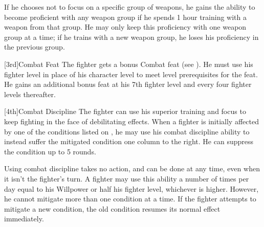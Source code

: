         If he chooses not to focus on a specific group of weapons, he gains the ability to become proficient with any weapon group if he spends 1 hour training with a weapon from that group.
        He may only keep this proficiency with one weapon group at a time; if he trains with a new weapon group, he loses his proficiency in the previous group.

        [3rd]{Combat Feat}
        The fighter gets a bonus Combat feat (see ).
        He must use his fighter level in place of his character level to meet level prerequisites for the feat.
        He gains an additional bonus feat at his 7th fighter level and every four fighter levels thereafter.

        [4th]{Combat Discipline}
        The fighter can use his superior training and focus to keep fighting in the face of debilitating effects.
        When a fighter is initially affected by one of the conditions listed on , he may use his combat discipline ability to instead suffer the mitigated condition one column to the right.
        He can suppress the condition up to 5 rounds.

        \par Using combat discipline takes no action, and can be done at any time, even when it isn't the fighter's turn.
        A fighter may use this ability a number of times per day equal to his Willpower or half his fighter level, whichever is higher.
        However, he cannot mitigate more than one condition at a time.
        If the fighter attempts to mitigate a new condition, the old condition resumes its normal effect immediately.

